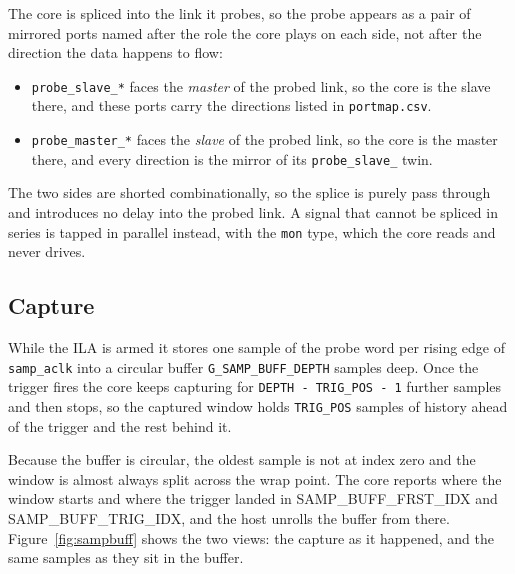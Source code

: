 \documentclass[twocolumn]{article}
\begin{document}
The core is spliced into the link it probes, so the probe appears as a pair of mirrored ports named after the role the core plays on each side, not after the direction the data happens to flow:

\begin{itemize}
    \item \texttt{probe\_slave\_*} faces the \emph{master} of the probed link, so the core is the slave there, and these ports carry the directions listed in \texttt{portmap.csv}.
    \item \texttt{probe\_master\_*} faces the \emph{slave} of the probed link, so the core is the master there, and every direction is the mirror of its \texttt{probe\_slave\_} twin.
\end{itemize}

The two sides are shorted combinationally, so the splice is purely pass through and introduces no delay into the probed link. A signal that cannot be spliced in series is tapped in parallel instead, with the \texttt{mon} type, which the core reads and never drives.

\subsection{Capture}
While the \acs{ILA} is armed it stores one sample of the probe word per rising edge of \texttt{samp\_aclk} into a circular buffer \texttt{G\_SAMP\_BUFF\_DEPTH} samples deep. Once the trigger fires the core keeps capturing for \texttt{DEPTH - TRIG\_POS - 1}  further samples and then stops, so the captured window holds \texttt{TRIG\_POS} samples of history ahead of the trigger and the rest behind it.

Because the buffer is circular, the oldest sample is not at index zero and the window is almost always split across the wrap point. The core reports where the window starts and where the trigger landed in SAMP\_BUFF\_FRST\_IDX and SAMP\_BUFF\_TRIG\_IDX, and the host unrolls the buffer from there. Figure~\ref{fig:sampbuff} shows the two views: the capture as it happened, and the same samples as they sit in the buffer.
\end{document}
